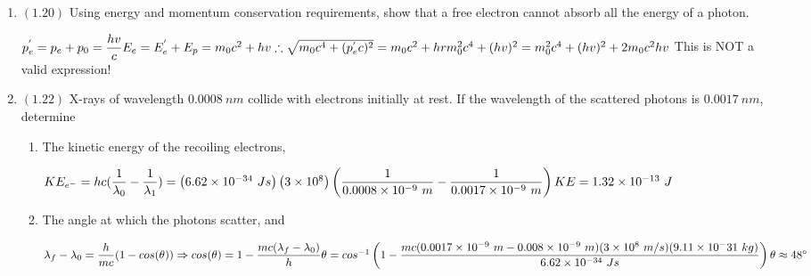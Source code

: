 \documentclass[fleqn]{article}
\begin{document}
\begin{enumerate}
    \item $(\mathbf{1.20})$ Using energy and momentum conservation requirements, show that a free electron cannot absorb all the energy of a photon.

      \textcolor{hwColor}{
        $
          p^{'}_e=p_e+p_0=\dfrac{hv}{c} \\
          \\
          E_e=E^{'}_e+E_p=m_0c^2+hv \\
          \\
          \therefore \sqrt{m_0c^4+(p^{'}_e c)^2}=m_0c^2+hr \\
          \\
          m^2_0c^4+(hv)^2=m^2_0c^4+(hv)^2+2m_0c^2hv \\ \\
        $
        This is NOT a valid expression!
      }

    \item $(\mathbf{1.22})$ X-rays of wavelength $0.0008 ~ nm$ collide with electrons initially at rest. If the wavelength of the scattered photons is 
    $0.0017 ~ nm$, determine
      \begin{enumerate}
        \item The kinetic energy of the recoiling electrons,

          \textcolor{hwColor}{
            $
              KE_{e^{-}}=hc(\dfrac{1}{\lambda_0}-\dfrac{1}{\lambda_1})=\left(6.62 \times 10^{-34} ~ Js\right)\left(3 \times 10^8\right)\left(\dfrac{1}{0.0008 \times 10^{-9} ~ m}-\dfrac{1}{0.0017 \times 10^{-9} ~ m}\right) \\
              \\
              KE=1.32 \times 10^{-13} ~ J
            $
          }

        \item The angle at which the photons scatter, and

          \textcolor{hwColor}{
            $
              \lambda_f-\lambda_0=\dfrac{h}{mc}(1-cos(\theta)) \Rightarrow cos(\theta)=1-\dfrac{mc(\lambda_f-\lambda_0)}{h} \\
              \\
              \theta=cos^{-1}\left(1-\dfrac{mc(0.0017 \times 10^{-9} ~ m-0.008 \times 10^{-9} ~ m)(3 \times 10^8 ~ m/s)(9.11 \times 10^-{31} ~ kg)}{6.62 \times 10^{-34} ~ Js}\right) \\
              \\
              \theta \approx 48^{\circ}
            $
          }


\end{enumerate}
\end{enumerate}
\end{document}
